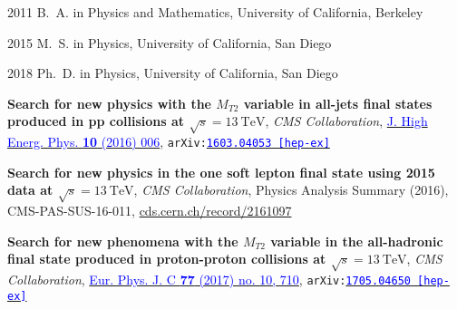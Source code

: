 \begin{frontmatter}
\begin{vitapage}                                                               
\begin{vita}                                                                   
  \item[2011] B.~A. in Physics and Mathematics, University of California, Berkeley                                                    
  \item[2015] M.~S. in Physics, University of California, San Diego                                                    
  \item[2018] Ph.~D. in Physics, University of California, San Diego    
\end{vita}                                                                     
\begin{publications}                                                           
\item \textbf{Search for new physics with the $M_{T2}$ variable in all-jets final states produced in pp collisions at $\sqrt{s}=13~\mathrm{TeV}$}, {\it CMS Collaboration},  \href{http://dx.doi.org/10.1007/JHEP10(2016)006}{\textcolor{blue}{J. High Energ. Phys. \textbf{10} (2016) 006}}, {\tt arXiv:\href{http://arxiv.org/abs/1603.04053}{\textcolor{blue}{1603.04053 [hep-ex]}}}
\item \textbf{Search for new physics in the one soft lepton final state using 2015 data at $\sqrt{s}=13~\mathrm{TeV}$}, {\it CMS Collaboration}, Physics Analysis Summary (2016), CMS-PAS-SUS-16-011, \textcolor{blue}{\href{https://cds.cern.ch/record/2161097}{cds.cern.ch/record/2161097}}
\item \textbf{Search for new phenomena with the $M_{T2}$ variable in the all-hadronic final state produced in proton-proton collisions at $\sqrt{s}=13~\mathrm{TeV}$}, {\it CMS Collaboration}, \href{http://dx.doi.org/10.1140/epjc/s10052-017-5267-x}{\textcolor{blue}{Eur. Phys. J. C {\bf77} (2017) no. 10, 710}}, {\tt arXiv:\href{http://arxiv.org/abs/1705.04650}{\textcolor{blue}{1705.04650 [hep-ex]}}}

\end{publications}                                                             
\end{vitapage}                                                                 
                                                                               


\end{frontmatter}
